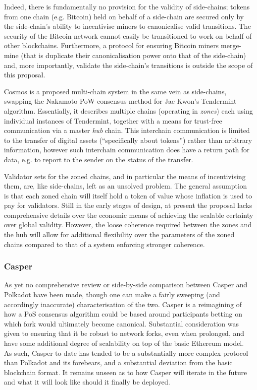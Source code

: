 \documentclass[9pt,oneside]{amsart}
\makeatletter
\newcommand*\eg{e.g.\@\xspace}
\makeatother
\begin{document}
\begin{multicols}{2}
Indeed, there is fundamentally no provision for the validity of side-chains; tokens from one chain (\eg Bitcoin) held on behalf of a side-chain are secured only by the side-chain's ability to incentivise miners to canonicalise valid transitions. The security of the Bitcoin network cannot easily be transitioned to work on behalf of other blockchains. Furthermore, a protocol for ensuring Bitcoin miners merge-mine (that is duplicate their canonicalisation power onto that of the side-chain) and, more importantly, validate the side-chain's transitions is outside the scope of this proposal.

Cosmos \cite{kwon2016cosmos} is a proposed multi-chain system in the same vein as side-chains, swapping the Nakamoto PoW consensus method for Jae Kwon's Tendermint algorithm. Essentially, it describes multiple chains (operating in \textit{zones}) each using individual instances of Tendermint, together with a means for trust-free communication via a master \textit{hub} chain. This interchain communication is limited to the transfer of digital assets (``specifically about tokens'') rather than arbitrary information, however such interchain communication does have a return path for data, e.g. to report to the sender on the status of the transfer.

Validator sets for the zoned chains, and in particular the means of incentivising them, are, like side-chains, left as an unsolved problem. The general assumption is that each zoned chain will itself hold a token of value whose inflation is used to pay for validators. Still in the early stages of design, at present the proposal lacks comprehensive details over the economic means of achieving the scalable certainty over global validity. However, the loose coherence required between the zones and the hub will allow for additional flexibility over the parameters of the zoned chains compared to that of a system enforcing stronger coherence.

\subsubsection{Casper}\label{casper}

As yet no comprehensive review or side-by-side comparison between Casper \cite{buterin2016mauve} and Polkadot have been made, though one can make a fairly sweeping (and accordingly inaccurate) characterisation of the two. Casper is a reimagining of how a PoS consensus algorithm could be based around participants betting on which fork would ultimately become canonical. Substantial consideration was given to ensuring that it be robust to network forks, even when prolonged, and have some additional degree of scalability on top of the basic Ethereum model. As such, Casper to date has tended to be a substantially more complex protocol than Polkadot and its forebears, and a substantial deviation from the basic blockchain format. It remains unseen as to how Casper will iterate in the future and what it will look like should it finally be deployed.


\end{multicols}
\end{document}
